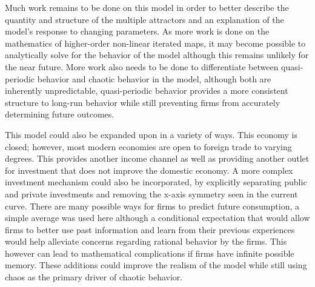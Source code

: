 Much work remains to be done on this model in order to better describe the quantity and structure of the multiple attractors and an explanation of the model's response to changing parameters. As more work is done on the mathematics of higher-order non-linear iterated maps, it may become possible to analytically solve for the behavior of the model although this remains unlikely for the near future. More work also needs to be done to differentiate between quasi-periodic behavior and chaotic behavior in the model, although both are inherently unpredictable, quasi-periodic behavior provides a more consistent structure to long-run behavior while still preventing firms from accurately determining future outcomes.

This model could also be expanded upon in a variety of ways. This economy is closed; however, most modern economies are open to foreign trade to varying degrees. This provides another income channel as well as providing another outlet for investment that does not improve the domestic economy. A more complex investment mechanism could also be incorporated, by explicitly separating public and private investments and removing the x-axis symmetry seen in the current curve. There are many possible ways for firms to predict future consumption, a simple average was used here although a conditional expectation that would allow firms to better use past information and learn from their previous experiences would help alleviate concerns regarding rational behavior by the firms. This however can lead to mathematical complications if firms have infinite possible memory. These additions could improve the realism of the model while still using chaos as the primary driver of chaotic behavior. 



